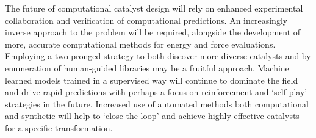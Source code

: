 \documentclass[../main.tex]{subfiles}
\begin{document}
The future of computational catalyst design will rely on enhanced experimental collaboration and verification of computational predictions. An increasingly inverse approach to the problem will be required, alongside the development of more, accurate computational methods for energy and force evaluations. Employing a two-pronged strategy to both discover more diverse catalysts and by enumeration of human-guided libraries may be a fruitful approach. Machine learned models trained in a supervised way will continue to dominate the field and drive rapid predictions with perhaps a focus on reinforcement and `self-play' strategies in the future. Increased use of automated methods both computational and synthetic will help to `close-the-loop' and achieve highly effective catalysts for a specific transformation.






\clearpage
\end{document}
